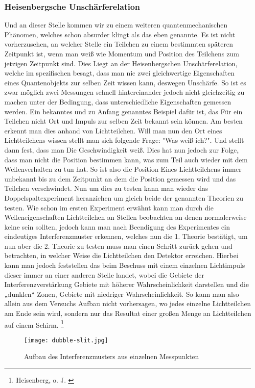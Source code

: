 \documentclass[12pt]{report}
\begin{document}
\subsubsection{Heisenbergsche Unschärferelation} 
Und an dieser Stelle kommen wir zu einem weiteren quantenmechanischen Phänomen, welches schon absurder klingt als das eben genannte. Es ist nicht vorherzusehen, an welcher Stelle ein Teilchen zu einem bestimmten späteren Zeitpunkt ist, wenn man weiß wie Momentum und Position des Teilchens zum jetzigen Zeitpunkt sind. Dies Liegt an der Heisenbergschen Unschärferelation, welche im spezifischen besagt, dass man nie zwei gleichwertige Eigenschaften eines Quantenobjekts zur selben Zeit wissen kann, deswegen Unschärfe. So ist es zwar möglich zwei Messungen schnell hintereinander jedoch nicht gleichzeitig zu machen unter der Bedingung, dass unterschiedliche Eigenschaften gemessen werden. Ein bekanntes und zu Anfang genanntes Beispiel dafür ist, das Für ein Teilchen nicht Ort und Impuls zur selben Zeit bekannt sein können. Am besten erkennt man dies anhand von Lichtteilchen. Will man nun den Ort eines Lichtteilchens wissen stellt man sich folgende Frage: "Was weiß ich?". Und stellt dann fest, dass man Die Geschwindigkeit weiß. Dies hat nun jedoch zur Folge, dass man nicht die Position bestimmen kann, was zum Teil auch wieder mit dem Wellenverhalten zu tun hat. So ist also die Position Eines Lichtteilchens immer unbekannt bis zu dem Zeitpunkt an dem die Position gemessen wird und das Teilchen verschwindet.   
Nun um dies zu testen kann man wieder das Doppelspaltexperiment heranziehen um gleich beide der genannten Theorien zu testen. Wie schon im ersten Experiment erwähnt kann man durch die Welleneigenschaften Lichtteilchen an Stellen beobachten an denen normalerweise keine sein sollten, jedoch kann man nach Beendigung des Experimentes ein eindeutiges Interferenzmuster erkennen, welches nun die 1. Theorie bestätigt, um nun aber die 2. Theorie zu testen muss man einen Schritt zurück gehen und betrachten, in welcher Weise die Lichtteilchen den Detektor erreichen. Hierbei kann man jedoch feststellen das beim Beschuss mit einem einzelnen Lichtimpuls dieser immer an einer anderen Stelle landet, wobei die Gebiete der Interferenzverstärkung Gebiete mit höherer Wahrscheinlichkeit  darstellen und die „dunklen“ Zonen, Gebiete mit niedriger Wahrscheinlichkeit. So kann man also allein aus dem Versuchs Aufbau nicht vorhersagen, wo jedes einzelne Lichtteilchen am Ende sein wird, sondern nur das Resultat einer großen Menge an Lichtteilchen auf einem Schirm. \footnote{Heisenberg, o. J. \cite{a222-2}}
\begin{figure}[h]
	\centering
\texttt{[image: dubble-slit.jpg]}
 	 	\caption{Aufbau des Interferenzmusters aus einzelnen Messpunkten}
 	 	 
\end{figure}
 	 	
\end{document}
